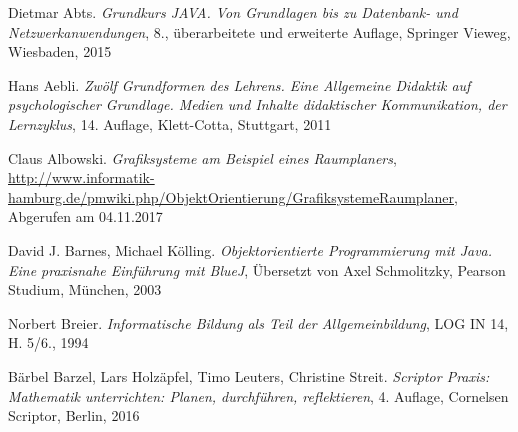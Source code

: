 \begin{thebibliography}{ABCDEF}

\renewcommand{\refname}{\normalsize Literaturverzeichnis}


Dietmar Abts. \emph{Grundkurs JAVA. Von Grundlagen bis zu Datenbank- und Netzwerkanwendungen}, 8., überarbeitete und erweiterte Auflage, Springer Vieweg, Wiesbaden, 2015

Hans Aebli. \emph{Zwölf Grundformen des Lehrens. Eine Allgemeine Didaktik auf psychologischer Grundlage. Medien und Inhalte didaktischer Kommunikation, der Lernzyklus}, 14. Auflage, Klett-Cotta, Stuttgart, 2011

Claus Albowski. \emph{Grafiksysteme am Beispiel eines Raumplaners}, \url{http://www.informatik-hamburg.de/pmwiki.php/ObjektOrientierung/GrafiksystemeRaumplaner}, Abgerufen am 04.11.2017

David J. Barnes, Michael Kölling. \emph{Objektorientierte Programmierung mit Java. Eine praxisnahe Einführung mit BlueJ}, Übersetzt von Axel Schmolitzky, Pearson Studium, München, 2003

Norbert Breier. \emph{Informatische Bildung als Teil der Allgemeinbildung}, LOG IN 14, H. 5/6., 1994

Bärbel Barzel, Lars Holzäpfel, Timo Leuters, Christine Streit. \emph{Scriptor Praxis: Mathematik unterrichten: Planen, durchführen, reflektieren}, 4. Auflage, Cornelsen Scriptor, Berlin, 2016





\end{thebibliography}
